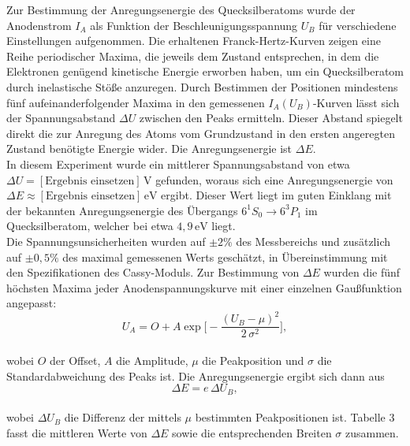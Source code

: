 Zur Bestimmung der Anregungsenergie des Quecksilberatoms wurde der Anodenstrom $I_A$ als Funktion der Beschleunigungsspannung $U_B$ für verschiedene Einstellungen aufgenommen. Die erhaltenen Franck-Hertz-Kurven zeigen eine Reihe periodischer Maxima, die jeweils dem Zustand entsprechen, in dem die Elektronen genügend kinetische Energie erworben haben, um ein Quecksilberatom durch inelastische Stöße anzuregen. Durch Bestimmen der Positionen mindestens fünf aufeinanderfolgender Maxima in den gemessenen $I_A(U_B)$-Kurven lässt sich der Spannungsabstand $\Delta U$ zwischen den Peaks ermitteln. Dieser Abstand spiegelt direkt die zur Anregung des Atoms vom Grundzustand in den ersten angeregten Zustand benötigte Energie wider. Die Anregungsenergie ist $\Delta E$. 
\vspace{0.3cm}\\
In diesem Experiment wurde ein mittlerer Spannungsabstand von etwa $\Delta U = [\text{Ergebnis einsetzen}]\,\mathrm{V}$ gefunden, woraus sich eine Anregungsenergie von $\Delta E \approx [\text{Ergebnis einsetzen}]\,\mathrm{eV}$ ergibt. Dieser Wert liegt im guten Einklang mit der bekannten Anregungsenergie des Übergangs $6^1S_0 \to 6^3P_1$ im Quecksilberatom, welcher bei etwa $4{,}9\,\mathrm{eV}$ liegt.
\vspace{0.3cm}\\
Die Spannungsunsicherheiten wurden auf $\pm 2\%$ des Messbereichs und zusätzlich auf $\pm 0{,}5\%$ des maximal gemessenen Werts geschätzt, in Übereinstimmung mit den Spezifikationen des Cassy-Moduls. Zur Bestimmung von $\Delta E$ wurden die fünf höchsten Maxima jeder Anodenspannungskurve mit einer einzelnen Gaußfunktion angepasst:
\vspace{0.3cm}\\
\begin{equation}
  U_A = O + A \exp\!\biggl[-\frac{(U_B - \mu)^2}{2\,\sigma^2}\biggr],
\end{equation}
\vspace{0.3cm}\\
wobei $O$ der Offset, $A$ die Amplitude, $\mu$ die Peakposition und $\sigma$ die Standardabweichung des Peaks ist. Die Anregungsenergie ergibt sich dann aus
\vspace{0.3cm}\\
\begin{equation}
  \Delta E = e \,\Delta U_B,
\end{equation}
\vspace{0.3cm}\\
wobei $\Delta U_B$ die Differenz der mittels $\mu$ bestimmten Peakpositionen ist. Tabelle 3 fasst die mittleren Werte von $\Delta E$ sowie die entsprechenden Breiten $\sigma$ zusammen.


